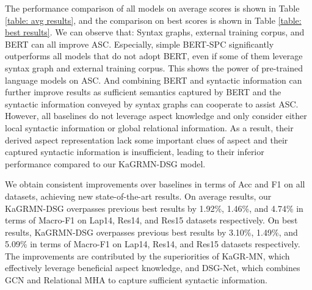 The performance comparison of all models on average scores is shown in Table \ref{table: avg results}, and the comparison on best scores is shown in Table \ref{table: best results}.
We can observe that:
Syntax graphs, external training corpus, and BERT can all improve ASC.
Especially, simple BERT-SPC significantly outperforms all models that do not adopt BERT, even if some of them leverage syntax graph and external training corpus.
This shows the power of pre-trained language models on ASC.
And combining BERT and syntactic information can further improve results as sufficient semantics captured by BERT and the syntactic information conveyed by syntax graphs can cooperate to assist ASC.
However, all baselines do not leverage aspect knowledge and only consider either local syntactic information or global relational information.
As a result, their derived aspect representation lack some important clues of aspect and their captured syntactic information is insufficient, leading to their inferior performance compared to our KaGRMN-DSG model.


We obtain consistent improvements over baselines in terms of Acc and F1 on all datasets, achieving new state-of-the-art results.
On average results, our KaGRMN-DSG overpasses previous best results by 1.92\%, 1.46\%, and 4.74\% in terms of Macro-F1 on Lap14, Res14, and Res15 datasets respectively.
On best results, KaGRMN-DSG overpasses previous best results by 3.10\%, 1.49\%, and 5.09\% in terms of Macro-F1 on Lap14, Res14, and Res15 datasets respectively.
The improvements are contributed by the superiorities of KaGR-MN, which effectively leverage beneficial aspect knowledge, and DSG-Net, which combines GCN and Relational MHA to capture sufficient syntactic information.





